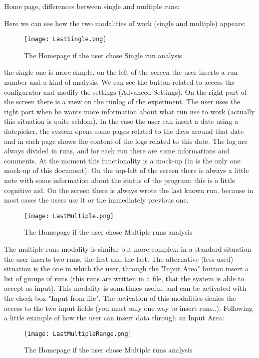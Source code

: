 Home page, differences between single and multiple runs:

Here we can see how the two modalities of work (single and multiple) appears: 
\begin{figure}[H]
\centering
\texttt{[image: LastSingle.png]} 
\caption{The Homepage if the user chose Single run analysis}
\end{figure}

the single one is more simple, on the left of the screen the user inserts a run number and a kind of analysis. We can see the button related to access the configurator and modify the settings (Advanced Settings). On the right part of the screen there is a view on the runlog of the experiment. The user uses the right part when he wants more information about what run use to work (actually this situation is quite seldom). In the case the user can insert a date using a datepicker, the system opens some pages related to the days around that date and in each page shows the content of the logs related to this date. The log are always divided in runs, and for each run there are some informations and comments. At the moment this functionality is a mock-up (in is the only one mock-up of this document). On the top-left of the screen there is always a little note with some information about the status of the program: this is a little cognitive aid. On the screen there is always wrote the last known run, because in most cases the users use it or the immediately previous one. 


\begin{figure}[H]
\centering
\texttt{[image: LastMultiple.png]} 
\caption{The Homepage if the user chose Multiple runs analysis}
\end{figure}    

The multiple runs modality is similar but more complex: in a standard situation the user inserts two runs, the first and the last. The alternative (less used) situation is the one in which the user, through the "Input Area" button insert a  list of groups of runs (this runs are written in a file, that the system is able to accept as input). This modality is sometimes useful, and can be activated with the check-box "Input from file". The activation of this modalities denies the access to the two input fields (you must only one way to insert runs..).
Following a little example of how the user can insert data through an Input Area:

\begin{figure}[H]
\centering
\texttt{[image: LastMultipleRange.png]} 
\caption{The Homepage if the user chose Multiple runs analysis}
\end{figure}   


